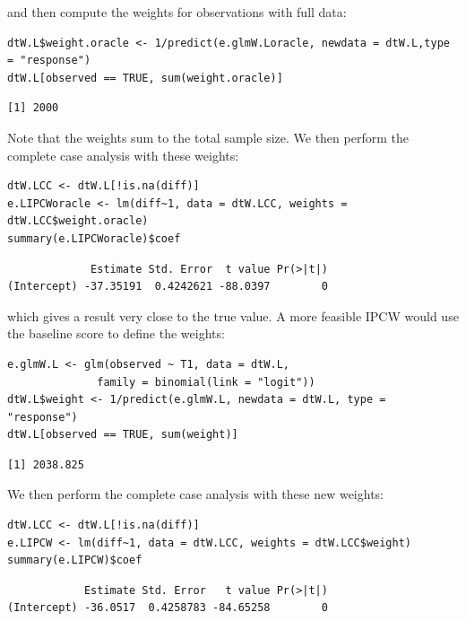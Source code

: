 \documentclass[12pt]{article}
\begin{document}
and then compute the weights for observations with full data:
\lstset{language=r,label= ,caption= ,captionpos=b,numbers=none}
\begin{lstlisting}
dtW.L$weight.oracle <- 1/predict(e.glmW.Loracle, newdata = dtW.L,type = "response")
dtW.L[observed == TRUE, sum(weight.oracle)]
\end{lstlisting}

\begin{verbatim}
[1] 2000
\end{verbatim}


Note that the weights sum to the total sample size. We then perform
the complete case analysis with these weights:
\lstset{language=r,label= ,caption= ,captionpos=b,numbers=none}
\begin{lstlisting}
dtW.LCC <- dtW.L[!is.na(diff)]
e.LIPCWoracle <- lm(diff~1, data = dtW.LCC, weights = dtW.LCC$weight.oracle)
summary(e.LIPCWoracle)$coef
\end{lstlisting}

\begin{verbatim}
             Estimate Std. Error  t value Pr(>|t|)
(Intercept) -37.35191  0.4242621 -88.0397        0
\end{verbatim}


which gives a result very close to the true value. A more feasible
IPCW would use the baseline score to define the weights:
\lstset{language=r,label= ,caption= ,captionpos=b,numbers=none}
\begin{lstlisting}
e.glmW.L <- glm(observed ~ T1, data = dtW.L,
              family = binomial(link = "logit"))
dtW.L$weight <- 1/predict(e.glmW.L, newdata = dtW.L, type = "response")
dtW.L[observed == TRUE, sum(weight)]
\end{lstlisting}

\begin{verbatim}
[1] 2038.825
\end{verbatim}


We then perform the complete case analysis with these new weights:
\lstset{language=r,label= ,caption= ,captionpos=b,numbers=none}
\begin{lstlisting}
dtW.LCC <- dtW.L[!is.na(diff)]
e.LIPCW <- lm(diff~1, data = dtW.LCC, weights = dtW.LCC$weight)
summary(e.LIPCW)$coef
\end{lstlisting}

\begin{verbatim}
            Estimate Std. Error   t value Pr(>|t|)
(Intercept) -36.0517  0.4258783 -84.65258        0
\end{verbatim}
\end{document}
